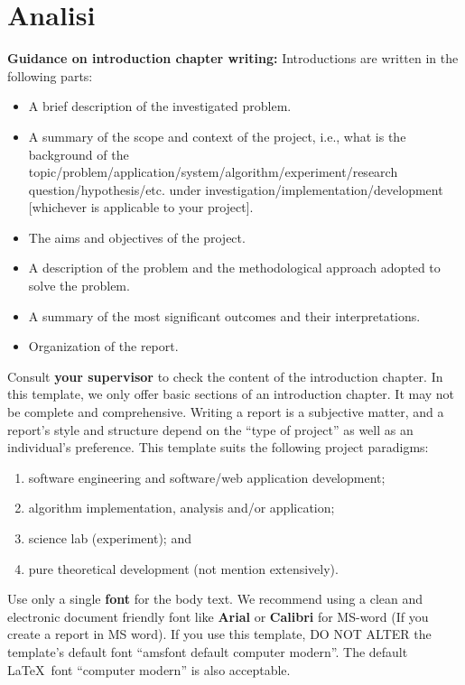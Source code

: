 \chapter{Analisi}
\label{ch:analysis} %

\textbf{Guidance on introduction chapter writing:} Introductions are written in the following parts:
\begin{itemize}
    \item A brief  description of the investigated problem.
    \item A summary of the scope and context of the project, i.e., what is the background of the topic/problem/application/system/algorithm/experiment/research question/hypothesis/etc. under investigation/implementation/development [whichever is applicable to your project].
    \item The aims and objectives of the project.
    \item A description of the problem and the methodological approach adopted to solve the problem.
    \item A summary of the most significant outcomes and their interpretations.
    \item Organization of the report. 
\end{itemize}


Consult \textbf{your supervisor} to check the content of the introduction chapter. In this template, we only offer basic sections of an introduction chapter. It may  not be complete and comprehensive. Writing a report is a subjective matter, and a report's style and structure depend on the ``type of project'' as well as an individual's preference. This template suits the following project paradigms:
\begin{enumerate}
    \item software engineering and software/web application development;
    \item algorithm implementation, analysis and/or application;  
    \item science lab (experiment); and
    \item pure theoretical development (not mention extensively).
\end{enumerate}

Use only a single \textbf{font} for the body text. We recommend using a clean and electronic document friendly font like \textbf{Arial} or \textbf{Calibri} for MS-word (If you create a report in MS word). If you use this template, DO NOT ALTER the template's default font ``amsfont default computer modern''. The default \LaTeX~font ``computer modern'' is also acceptable. 

